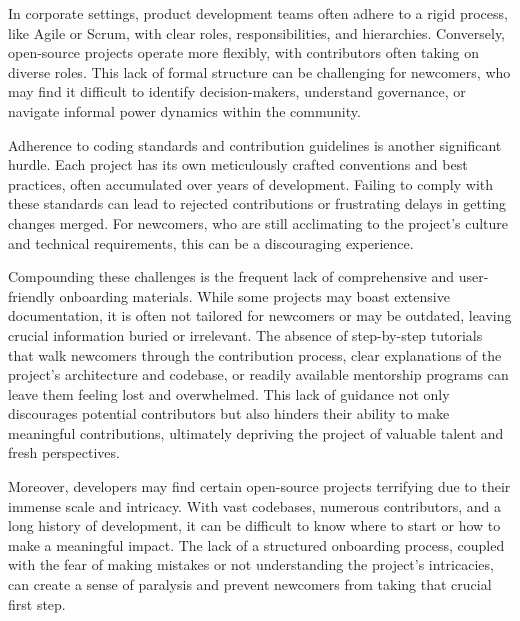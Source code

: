 In corporate settings, product development teams often adhere to a rigid process, like Agile or Scrum, with clear roles, responsibilities, and hierarchies. Conversely, open-source projects operate more flexibly, with contributors often taking on diverse roles. This lack of formal structure can be challenging for newcomers, who may find it difficult to identify decision-makers, understand governance, or navigate informal power dynamics within the community.


Adherence to coding standards and contribution guidelines is another significant hurdle. Each project has its own meticulously crafted conventions and best practices, often accumulated over years of development. Failing to comply with these standards can lead to rejected contributions or frustrating delays in getting changes merged. For newcomers, who are still acclimating to the project's culture and technical requirements, this can be a discouraging experience.

Compounding these challenges is the frequent lack of comprehensive and user-friendly onboarding materials. While some projects may boast extensive documentation, it is often not tailored for newcomers or may be outdated, leaving crucial information buried or irrelevant. The absence of step-by-step tutorials that walk newcomers through the contribution process, clear explanations of the project's architecture and codebase, or readily available mentorship programs can leave them feeling lost and overwhelmed. This lack of guidance not only discourages potential contributors but also hinders their ability to make meaningful contributions, ultimately depriving the project of valuable talent and fresh perspectives.

Moreover, developers may find certain open-source projects terrifying due to their immense scale and intricacy. With vast codebases, numerous contributors, and a long history of development, it can be difficult to know where to start or how to make a meaningful impact. The lack of a structured onboarding process, coupled with the fear of making mistakes or not understanding the project's intricacies, can create a sense of paralysis and prevent newcomers from taking that crucial first step.



\clearpage